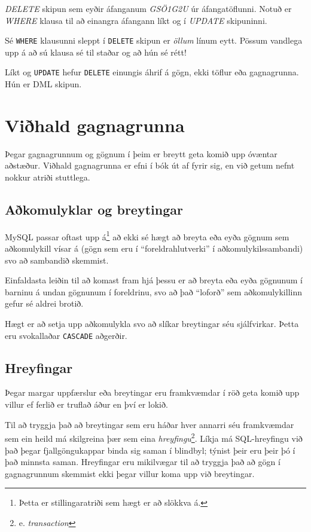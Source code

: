 \begin{example}
\caption[DELETE]{\emph{DELETE} skipun sem eyðir áfanganum \emph{GSÖ1G2U} úr áfangatöflunni. Notuð er \emph{WHERE} klausa til að einangra áfangann líkt og í \emph{UPDATE} skipuninni.}
\label{sql:k7d4-delete}
\centering
{}
\end{example}

Sé \verb|WHERE| klausunni sleppt í \verb|DELETE| skipun er \emph{öllum} línum eytt. Pössum vandlega upp á að sú klausa sé til staðar og að hún sé rétt!

Líkt og \verb|UPDATE| hefur \verb|DELETE| einungis áhrif á gögn, ekki töflur eða gagnagrunna. Hún er DML skipun.
\section{Viðhald gagnagrunna}
Þegar gagnagrunnum og gögnum í þeim er breytt geta komið upp óvæntar aðstæður. Viðhald gagnagrunna er efni í bók út af fyrir sig, en við getum nefnt nokkur atriði stuttlega.
\subsection{Aðkomulyklar og breytingar}
MySQL passar oftast upp á\footnote{Þetta er stillingaratriði sem hægt er að slökkva á.} að ekki sé hægt að breyta eða eyða gögnum sem aðkomulykill vísar á (gögn sem eru í ``foreldrahlutverki'' í aðkomulykilssambandi) svo að sambandið skemmist.

Einfaldasta leiðin til að komast fram hjá þessu er að breyta eða eyða gögnunum í barninu á undan gögnunum í foreldrinu, svo að það ``loforð'' sem aðkomulykillinn gefur sé aldrei brotið.

Hægt er að setja upp aðkomulykla svo að slíkar breytingar séu sjálfvirkar. Þetta eru svokallaðar \verb|CASCADE| aðgerðir.
\subsection{Hreyfingar} %
Þegar margar uppfærslur eða breytingar eru framkvæmdar í röð geta komið upp villur ef ferlið er truflað áður en því er lokið.

Til að tryggja það að breytingar sem eru háðar hver annarri séu framkvæmdar sem ein heild má skilgreina þær sem eina \emph{hreyfingu}\footnote{e. \emph{transaction}}. Líkja má SQL-hreyfingu við það þegar fjallgöngukappar binda sig saman í blindbyl; týnist þeir eru þeir þó í það minnsta saman. Hreyfingar eru mikilvægar til að tryggja það að gögn í gagnagrunnum skemmist ekki þegar villur koma upp við breytingar.

